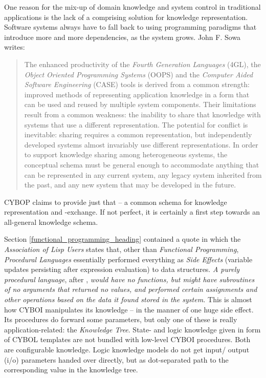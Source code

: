 One reason for the mix-up of domain knowledge and system control in traditional
applications is the lack of a comprising solution for knowledge representation.
Software systems always have to fall back to using programming paradigms that
introduce more and more dependencies, as the system grows. John F. Sowa
\cite{sowa} writes:

\begin{quote}
    The enhanced productivity of the \emph{Fourth Generation Languages} (4GL),
    the \emph{Object Oriented Programming Systems} (OOPS) and the
    \emph{Computer Aided Software Engineering} (CASE) tools is derived from a
    common strength: improved methods of representing application knowledge in
    a form that can be used and reused by multiple system components. Their
    limitations result from a common weakness: the inability to share that
    knowledge with systems that use a different representation. The potential
    for conflict is inevitable: sharing requires a common representation, but
    independently developed systems almost invariably use different
    representations. In order to support knowledge sharing among heterogeneous
    systems, the conceptual schema must be general enough to accommodate anything
    that can be represented in any current system, any legacy system inherited
    from the past, and any new system that may be developed in the future.
\end{quote}

CYBOP claims to provide just that -- a common schema for knowledge
representation and -exchange. If not perfect, it is certainly a first step
towards an all-general knowledge schema.

Section \ref{functional_programming_heading} contained a quote in which the
\emph{Association of Lisp Users} \cite{commonlisp} states that, other than
\emph{Functional Programming}, \emph{Procedural Languages} essentially performed
everything as \emph{Side Effects} (variable updates persisting after expression
evaluation) to data structures. \textit{A purely procedural language}, after
\cite{commonlisp}, \textit{would have no functions, but might have subroutines
of no arguments that returned no values, and performed certain assignments and
other operations based on the data it found stored in the system.} This is
almost how CYBOI manipulates its knowledge -- in the manner of one huge side
effect. Its procedures do forward some parameters, but only one of these is
really application-related: the \emph{Knowledge Tree}. State- and logic
knowledge given in form of CYBOL templates are not bundled with low-level CYBOI
procedures. Both are configurable knowledge. Logic knowledge models do not get
input/ output (i/o) parameters handed over directly, but as dot-separated path
to the corresponding value in the knowledge tree.

